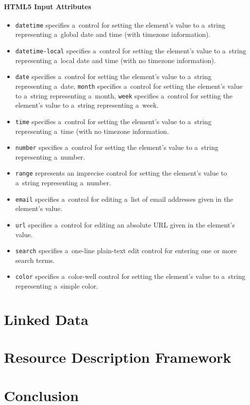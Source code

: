 \paragraph{HTML5 Input Attributes}
\begin{itemize}
\item \texttt{datetime} specifies a~control for setting the element's value
to a~string representing a~global date and time (with timezone information).
\item \texttt{datetime-local} specifies a~control for setting the element's value
to a~string representing a~local date and time (with no timezone information).
\item \texttt{date} specifies a~control for setting the element's value
to a~string representing a~date, \texttt{month} specifies a~control
for setting the element's value to a~string
representing a~month, \texttt{week} specifies a~control for setting the element's value
to a~string representing a~week.
\item \texttt{time} specifies a~control for setting the element's value
to a~string representing a~time (with no timezone information.
\item \texttt{number} specifies a~control for setting the element's value
to a~string representing a~number.
\item \texttt{range}  represents an imprecise control for setting the element's value
to a~string representing a~number.
\item \texttt{email} specifies a~control for editing a~list of email addresses
given in the element's value.
\item \texttt{url} specifies a~control for editing an absolute URL
given in the element's value.
\item \texttt{search} specifies a~one-line plain-text edit control
for entering one or more search terms.
\item \texttt{color} specifies a~color-well control for setting the element's value
to a~string representing a~simple color.
\end{itemize}

\section{Linked Data}

\section{Resource Description Framework}

\section{Conclusion}